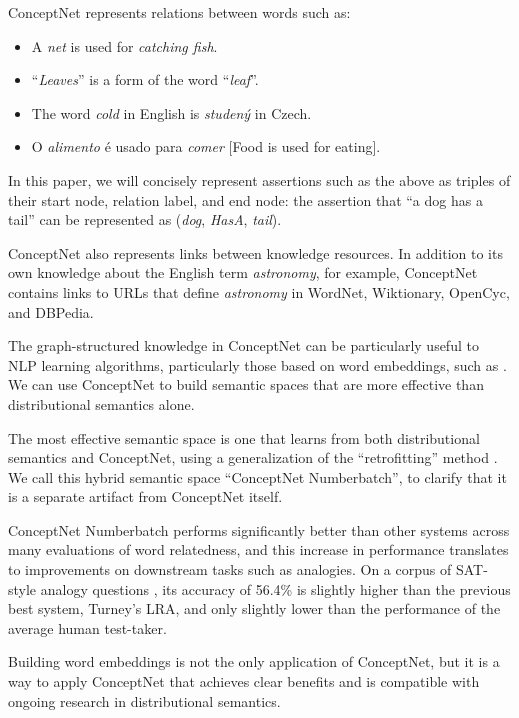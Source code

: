 \documentclass[letterpaper]{article}
\begin{document}
ConceptNet represents relations between words such as:

\begin{itemize}
    \item A \emph{net} is used for \emph{catching fish}.
    \item ``\emph{Leaves}'' is a form of the word ``\emph{leaf}''.
    \item The word \emph{cold} in English is \emph{studený} in Czech.
    \item O \emph{alimento} é usado para \emph{comer} [Food is used for eating].
\end{itemize}

In this paper, we will concisely represent assertions such as the above as triples of
their start node, relation label, and end node: the assertion that ``a dog has
a tail'' can be represented as (\emph{dog}, \emph{HasA}, \emph{tail}).

ConceptNet also represents links between knowledge resources. In addition to
its own knowledge about the English term \emph{astronomy}, for example,
ConceptNet contains links to URLs that define \emph{astronomy} in WordNet,
Wiktionary, OpenCyc, and DBPedia.

The graph-structured knowledge in ConceptNet can be particularly useful to NLP
learning algorithms, particularly those based on word embeddings, such as
\cite{mikolov2013word2vec}. We can use ConceptNet to build semantic spaces that
are more effective than distributional semantics alone.

The most effective semantic space is one that learns from both distributional
semantics and ConceptNet, using a generalization of the ``retrofitting'' method
\cite{faruqui2015retrofitting}. We call this hybrid semantic space ``ConceptNet
Numberbatch'', to clarify that it is a separate artifact from ConceptNet
itself.

ConceptNet Numberbatch performs significantly better than other systems across
many evaluations of word relatedness, and this increase in performance
translates to improvements on downstream tasks such as analogies.  On a
corpus of SAT-style analogy questions \cite{turney2005lra}, its accuracy of
56.4\% is slightly higher than the previous best system, Turney's LRA, and only
slightly lower than the performance of the average human test-taker.

Building word embeddings is not the only application of ConceptNet, but it is a
way to apply ConceptNet that achieves clear benefits and is compatible with
ongoing research in distributional semantics.
\end{document}
